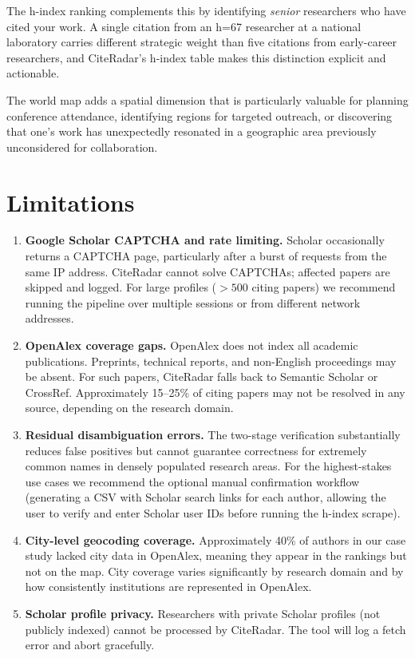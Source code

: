 \documentclass[11pt]{article}
\begin{document}
The h-index ranking complements this by identifying \emph{senior} researchers
who have cited your work.
A single citation from an h=67 researcher at a national laboratory carries
different strategic weight than five citations from early-career researchers,
and CiteRadar's h-index table makes this distinction explicit and actionable.

The world map adds a spatial dimension that is particularly valuable for
planning conference attendance, identifying regions for targeted outreach,
or discovering that one's work has unexpectedly resonated in a geographic
area previously unconsidered for collaboration.


\section{Limitations}
\label{sec:limit}

\begin{enumerate}[label=\arabic*., leftmargin=*]

\item \textbf{Google Scholar CAPTCHA and rate limiting.}
Scholar occasionally returns a CAPTCHA page, particularly after a burst
of requests from the same IP address.
CiteRadar cannot solve CAPTCHAs; affected papers are skipped and logged.
For large profiles ($> 500$ citing papers) we recommend running the pipeline
over multiple sessions or from different network addresses.

\item \textbf{OpenAlex coverage gaps.}
OpenAlex does not index all academic publications.
Preprints, technical reports, and non-English proceedings may be absent.
For such papers, CiteRadar falls back to Semantic Scholar or CrossRef.
Approximately 15--25\% of citing papers may not be resolved in any source,
depending on the research domain.

\item \textbf{Residual disambiguation errors.}
The two-stage verification substantially reduces false positives but
cannot guarantee correctness for extremely common names in densely
populated research areas.
For the highest-stakes use cases we recommend the optional manual
confirmation workflow (generating a CSV with Scholar search links for
each author, allowing the user to verify and enter Scholar user IDs before
running the h-index scrape).

\item \textbf{City-level geocoding coverage.}
Approximately 40\% of authors in our case study lacked city data in
OpenAlex, meaning they appear in the rankings but not on the map.
City coverage varies significantly by research domain and by how
consistently institutions are represented in OpenAlex.

\item \textbf{Scholar profile privacy.}
Researchers with private Scholar profiles (not publicly indexed) cannot
be processed by CiteRadar.
The tool will log a fetch error and abort gracefully.

\end{enumerate}
\end{document}
